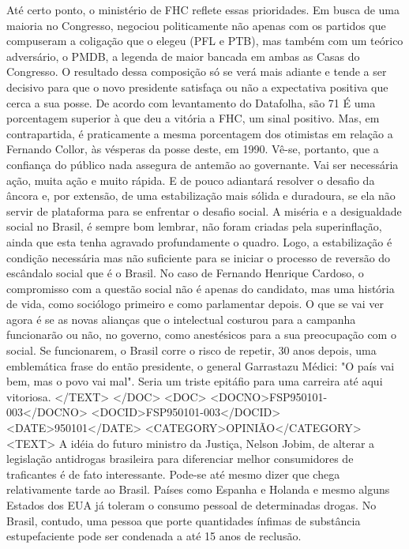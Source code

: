 Até certo ponto, o ministério de FHC reflete essas prioridades. Em busca de uma maioria no Congresso, negociou politicamente não apenas com os partidos que compuseram a coligação que o elegeu (PFL e PTB), mas também com um teórico adversário, o PMDB, a legenda de maior bancada em ambas as Casas do Congresso.
O resultado dessa composição só se verá mais adiante e tende a ser decisivo para que o novo presidente satisfaça ou não a expectativa positiva que cerca a sua posse. De acordo com levantamento do Datafolha, são 71%
É uma porcentagem superior à que deu a vitória a FHC, um sinal positivo. Mas, em contrapartida, é praticamente a mesma porcentagem dos otimistas em relação a Fernando Collor, às vésperas da posse deste, em 1990.
Vê-se, portanto, que a confiança do público nada assegura de antemão ao governante.
Vai ser necessária ação, muita ação e muito rápida. E de pouco adiantará resolver o desafio da âncora e, por extensão, de uma estabilização mais sólida e duradoura, se ela não servir de plataforma para se enfrentar o desafio social.
A miséria e a desigualdade social no Brasil, é sempre bom lembrar, não foram criadas pela superinflação, ainda que esta tenha agravado profundamente o quadro. Logo, a estabilização é condição necessária mas não suficiente para se iniciar o processo de reversão do escândalo social que é o Brasil.
No caso de Fernando Henrique Cardoso, o compromisso com a questão social não é apenas do candidato, mas uma história de vida, como sociólogo primeiro e como parlamentar depois.
O que se vai ver agora é se as novas alianças que o intelectual costurou para a campanha funcionarão ou não, no governo, como anestésicos para a sua preocupação com o social.
Se funcionarem, o Brasil corre o risco de repetir, 30 anos depois, uma emblemática frase do então presidente, o general Garrastazu Médici: "O país vai bem, mas o povo vai mal".
Seria um triste epitáfio para uma carreira até aqui vitoriosa.
</TEXT>
</DOC>
<DOC>
<DOCNO>FSP950101-003</DOCNO>
<DOCID>FSP950101-003</DOCID>
<DATE>950101</DATE>
<CATEGORY>OPINIÃO</CATEGORY>
<TEXT>
A idéia do futuro ministro da Justiça, Nelson Jobim, de alterar a legislação antidrogas brasileira para diferenciar melhor consumidores de traficantes é de fato interessante. Pode-se até mesmo dizer que chega relativamente tarde ao Brasil.
Países como Espanha e Holanda e mesmo alguns Estados dos EUA já toleram o consumo pessoal de determinadas drogas. No Brasil, contudo, uma pessoa que porte quantidades ínfimas de substância estupefaciente pode ser condenada a até 15 anos de reclusão.
